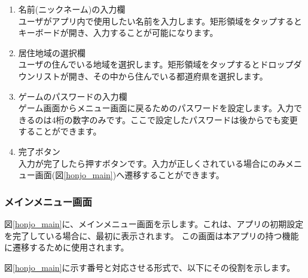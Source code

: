 \documentclass[a4j]{jarticle}
\begin{document}
\begin{enumerate}
  \renewcommand{\labelenumi}{\textcircled{\scriptsize \theenumi}}
  \item 名前(ニックネーム)の入力欄\\
        ユーザがアプリ内で使用したい名前を入力します。矩形領域をタップするとキーボードが開き、入力することが可能になります。
  \item 居住地域の選択欄\\
        ユーザの住んでいる地域を選択します。矩形領域をタップするとドロップダウンリストが開き、その中から住んでいる都道府県を選択します。
  \item ゲームのパスワードの入力欄\\
        ゲーム画面からメニュー画面に戻るためのパスワードを設定します。入力できるのは4桁の数字のみです。ここで設定したパスワードは後からでも変更することができます。
  \item 完了ボタン\\
        入力が完了したら押すボタンです。入力が正しくされている場合にのみメニュー画面(図\ref{honjo_main})へ遷移することができます。
\end{enumerate}


\subsubsection{メインメニュー画面}
図\ref{honjo_main}に、メインメニュー画面を示します。これは、アプリの初期設定を完了している場合に、最初に表示されます。
この画面は本アプリの持つ機能に遷移するために使用されます。

図\ref{honjo_main}に示す番号と対応させる形式で、以下にその役割を示します。
\end{document}
